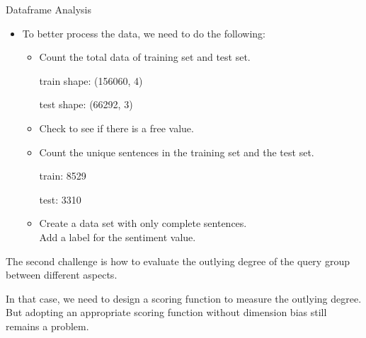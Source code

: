 \documentclass[
 size=14pt,
 paper=smartboard,  %
 mode=present, 		%
 display=slides, 	%
 style=tuliplab,  	%
 pauseslide,
 fleqn,leqno]{powerdot}
\begin{document}
\begin{slide}[toc=,bm=]{Dataframe Analysis}

  \begin{itemize}
  \item
  To better process the data, we need to do the following:
  
  \begin{itemize}
  \item
  Count the total data of training set and test set.
  
  train shape: (156060, 4) 
  
  test shape: (66292, 3)
  \item
  Check to see if there is a free value.
  \item
  Count the unique sentences in the training set and the test set.
  
  train: 8529 
  
  test: 3310
  \item
  Create a data set with only complete sentences. \\
  Add a label for the sentiment value.
  \end{itemize}
  \end{itemize}
  
  \begin{note}
  The second challenge is how to evaluate the outlying degree of
  the query group between different aspects.
  
  In that case,
  we need to design a scoring function to measure the outlying degree.
  But adopting an appropriate scoring function without dimension bias still remains a problem.
  \end{note}
  
  \end{slide}
\end{document}
